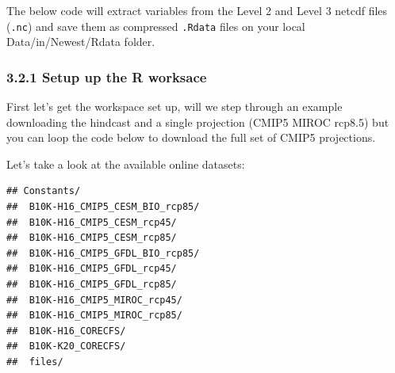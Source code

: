 \documentclass[
]{article}
\newenvironment{Shaded}{\begin{snugshade}}{\end{snugshade}}
\newcommand{\CharTok}[1]{\textcolor[rgb]{0.31,0.60,0.02}{#1}}
\newcommand{\CommentTok}[1]{\textcolor[rgb]{0.56,0.35,0.01}{\textit{#1}}}
\newcommand{\DataTypeTok}[1]{\textcolor[rgb]{0.13,0.29,0.53}{#1}}
\newcommand{\KeywordTok}[1]{\textcolor[rgb]{0.13,0.29,0.53}{\textbf{#1}}}
\newcommand{\NormalTok}[1]{#1}
\newcommand{\OperatorTok}[1]{\textcolor[rgb]{0.81,0.36,0.00}{\textbf{#1}}}
\newcommand{\StringTok}[1]{\textcolor[rgb]{0.31,0.60,0.02}{#1}}
\begin{document}
The below code will extract variables from the Level 2 and Level 3
netcdf files (\texttt{.nc}) and save them as compressed \texttt{.Rdata}
files on your local Data/in/Newest/Rdata folder.

\hypertarget{setup-up-the-r-worksace}{%
\subsubsection{3.2.1 Setup up the R
worksace}\label{setup-up-the-r-worksace}}

First let's get the workspace set up, will we step through an example
downloading the hindcast and a single projection (CMIP5 MIROC rcp8.5)
but you can loop the code below to download the full set of CMIP5
projections.

\begin{Shaded}
\end{Shaded}

Let's take a look at the available online datasets:

\begin{Shaded}
\end{Shaded}

\begin{verbatim}
## Constants/ 
##  B10K-H16_CMIP5_CESM_BIO_rcp85/ 
##  B10K-H16_CMIP5_CESM_rcp45/ 
##  B10K-H16_CMIP5_CESM_rcp85/ 
##  B10K-H16_CMIP5_GFDL_BIO_rcp85/ 
##  B10K-H16_CMIP5_GFDL_rcp45/ 
##  B10K-H16_CMIP5_GFDL_rcp85/ 
##  B10K-H16_CMIP5_MIROC_rcp45/ 
##  B10K-H16_CMIP5_MIROC_rcp85/ 
##  B10K-H16_CORECFS/ 
##  B10K-K20_CORECFS/ 
##  files/
\end{verbatim}
\end{document}
